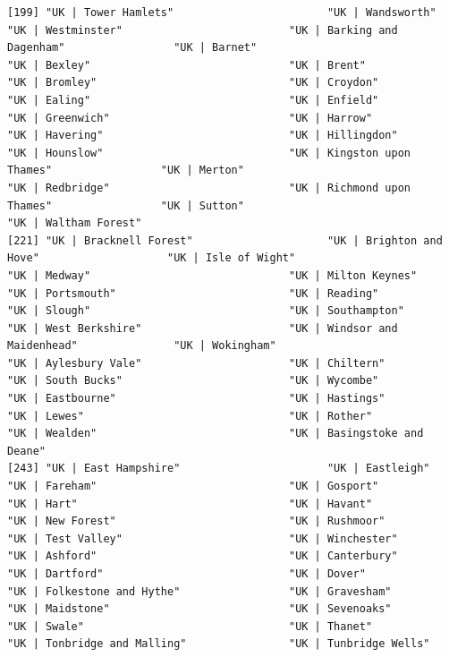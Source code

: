 \documentclass[11pt]{article}
\begin{document}
\begin{verbatim}
[199] "UK | Tower Hamlets"                        "UK | Wandsworth"                           "UK | Westminster"                          "UK | Barking and Dagenham"                 "UK | Barnet"                               "UK | Bexley"                               "UK | Brent"                                "UK | Bromley"                              "UK | Croydon"                              "UK | Ealing"                               "UK | Enfield"                              "UK | Greenwich"                            "UK | Harrow"                               "UK | Havering"                             "UK | Hillingdon"                           "UK | Hounslow"                             "UK | Kingston upon Thames"                 "UK | Merton"                               "UK | Redbridge"                            "UK | Richmond upon Thames"                 "UK | Sutton"                               "UK | Waltham Forest"                      
[221] "UK | Bracknell Forest"                     "UK | Brighton and Hove"                    "UK | Isle of Wight"                        "UK | Medway"                               "UK | Milton Keynes"                        "UK | Portsmouth"                           "UK | Reading"                              "UK | Slough"                               "UK | Southampton"                          "UK | West Berkshire"                       "UK | Windsor and Maidenhead"               "UK | Wokingham"                            "UK | Aylesbury Vale"                       "UK | Chiltern"                             "UK | South Bucks"                          "UK | Wycombe"                              "UK | Eastbourne"                           "UK | Hastings"                             "UK | Lewes"                                "UK | Rother"                               "UK | Wealden"                              "UK | Basingstoke and Deane"               
[243] "UK | East Hampshire"                       "UK | Eastleigh"                            "UK | Fareham"                              "UK | Gosport"                              "UK | Hart"                                 "UK | Havant"                               "UK | New Forest"                           "UK | Rushmoor"                             "UK | Test Valley"                          "UK | Winchester"                           "UK | Ashford"                              "UK | Canterbury"                           "UK | Dartford"                             "UK | Dover"                                "UK | Folkestone and Hythe"                 "UK | Gravesham"                            "UK | Maidstone"                            "UK | Sevenoaks"                            "UK | Swale"                                "UK | Thanet"                               "UK | Tonbridge and Malling"                "UK | Tunbridge Wells"                     

\end{verbatim}
\end{document}
